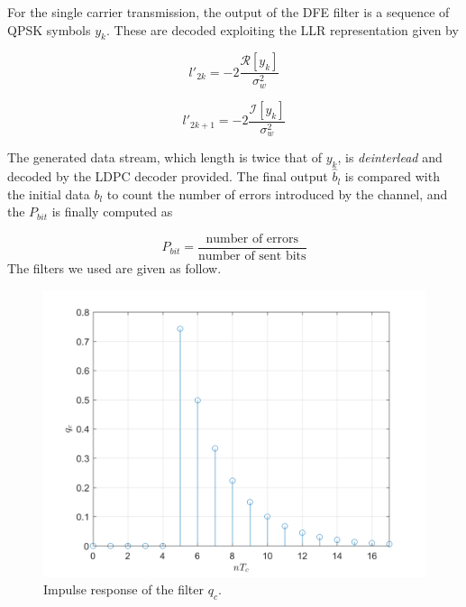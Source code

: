\documentclass[a4paper, 12pt]{report}
\begin{document}
\vspace{5em}

For the single carrier transmission, the output of the DFE filter is a sequence of QPSK symbols $y_k$. These are decoded exploiting the LLR representation given by 

\begin{equation}
l'_{2k} = -2\frac{\mathcal{R}[y_k]}{\sigma_w^2}
\end{equation}

\begin{equation}
l'_{2k+1} = -2\frac{\mathcal{I}[y_k]}{\sigma_w^2}
\end{equation}

The generated data stream, which length is twice that of $y_k$, is \textit{deinterlead} and decoded by the LDPC decoder provided. The final output $\hat{b}_l$ is compared with the initial data $b_l$ to count the number of errors introduced by the channel, and the $P_{bit}$ is finally computed as 

\begin{equation}
P_{bit} = \frac{\text{number of errors}}{\text{number of sent bits}}
\end{equation}
\clearpage
The filters we used are given as follow.

\begin{figure}[H]
	\centering
	\includegraphics[width=14cm]{qc}
	\caption{Impulse response of the filter $q_c$.}
\end{figure}
\end{document}
